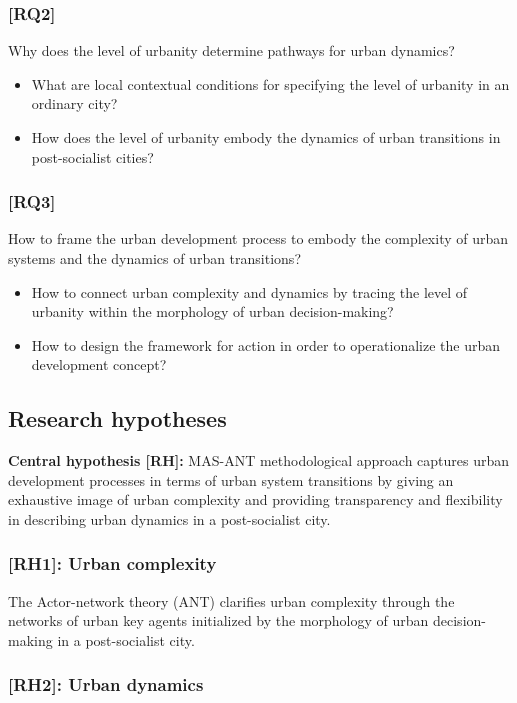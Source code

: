 \documentclass[11pt]{report}
\begin{document}
\subsubsection{[RQ2]}
Why does the level of urbanity determine pathways for urban dynamics? 
\begin{itemize}
\item What are local contextual conditions for specifying the level of urbanity in an ordinary city?
\item How does the level of urbanity embody the dynamics of urban transitions in post-socialist cities?
\end {itemize}

\subsubsection{[RQ3]}
How to frame the urban development process to embody the complexity of urban systems and the dynamics of urban transitions?
\begin{itemize}
\item How to connect urban complexity and dynamics by tracing the level of urbanity within the morphology of urban decision-making?
\item How to design the framework for action in order to operationalize the urban development concept?
\end {itemize}

\subsection{Research hypotheses}
\textbf{Central hypothesis [RH]:}
MAS-ANT methodological approach captures urban development processes in terms of urban system transitions by giving an exhaustive image of urban complexity and providing transparency and flexibility in describing urban dynamics in a post-socialist city.

\subsubsection{[RH1]: Urban complexity}

The Actor-network theory (ANT) clarifies urban complexity through the networks of urban key agents initialized by the morphology of urban decision-making in a post-socialist city.

\subsubsection{[RH2]: Urban dynamics}
\end{document}
